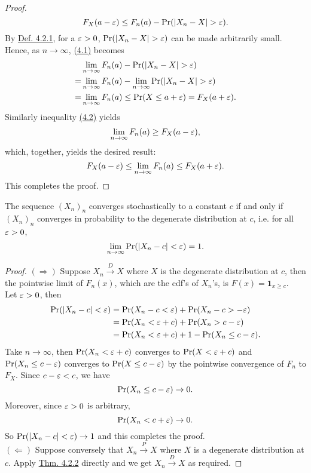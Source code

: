 \documentclass[11pt,fleqn]{book} %
\begin{document}
\begin{proof}
\begin{equation}
F_X(a - \varepsilon) \leq F_n(a) - \Pr(|X_n - X| > \varepsilon).
\end{equation}
\indent By \hyperref[def:421]{Def. 4.2.1}, for a \(\varepsilon > 0\), \(\Pr(|X_n - X| > \varepsilon)\) can be made arbitrarily small. Hence, as \(n\rightarrow\infty\), \hyperref[eqn:4221]{(4.1)} becomes 
\[
\begin{aligned}
&\lim_{n\rightarrow\infty} F_n(a) - \Pr(|X_n - X| > \varepsilon) \\
= &\lim_{n\rightarrow\infty} F_n(a) - \lim_{n\rightarrow\infty}\Pr(|X_n - X| > \varepsilon) \\
= &\lim_{n\rightarrow\infty} F_n(a) 
\leq \Pr(X \leq a + \varepsilon) 
= F_X(a + \varepsilon).
\end{aligned}
\]
\indent Similarly inequality \hyperref[eqn:4222]{(4.2)} yields
\[
\lim_{n\rightarrow\infty} F_n(a) \geq F_X(a - \varepsilon),
\]
which, together, yields the desired result:
\[
F_X(a - \varepsilon) \leq \lim_{n\rightarrow\infty}F_n(a) \leq F_X(a + \varepsilon).
\]
\indent This completes the proof.
\end{proof}

\begin{theorem} \label{thm:423}
The sequence \((X_n)_n\) converges stochastically to a constant \(c\) if and only if \((X_n)_n\) converges in probability to the degenerate distribution at \(c\), i.e. for all \(\varepsilon > 0\),
\[
\lim_{n\rightarrow\infty}\Pr(|X_n - c| < \varepsilon) = 1.
\]
\end{theorem}
\begin{proof} \((\Rightarrow)\) Suppose \(X_n \xrightarrow{D}X\) where \(X\) is the degenerate distribution at \(c\), then the pointwise limit of \(F_n(x)\), which are the cdf's of \(X_n\)'s, is \(F(x) = \mathbf{1}_{x \geq c}\). \\
\indent Let \(\varepsilon > 0\), then
\[
\begin{aligned}
\Pr(|X_n - c| < \varepsilon) &= \Pr(X_n - c < \varepsilon) + \Pr(X_n - c > -\varepsilon) \\
&= \Pr(X_n < \varepsilon + c) + \Pr(X_n > c - \varepsilon) \\
&= \Pr(X_n < \varepsilon + c) + 1 - \Pr(X_n \leq c - \varepsilon).
\end{aligned}
\]
\indent Take \(n\rightarrow\infty\), then \(\Pr(X_n < \varepsilon + c)\) converges to \(\Pr(X < \varepsilon + c)\) and \(\Pr(X_n \leq c - \varepsilon)\) converges to \(\Pr(X \leq c - \varepsilon)\) by the pointwise convergence of \(F_n\) to \(F_X\). Since \(c - \varepsilon < c\), we have
\[
\Pr(X_n \leq c - \varepsilon) \rightarrow 0.
\]
\indent Moreover, since \(\varepsilon > 0\) is arbitrary,
\[
\Pr(X_n < c + \varepsilon) \rightarrow 0.
\]
\indent So \(\Pr(|X_n - c| < \varepsilon) \rightarrow 1\) and this completes the proof. \\
\((\Leftarrow)\) Suppose conversely that \(X_n\xrightarrow{P}X\) where \(X\) is a degenerate distribution at \(c\). Apply \hyperref[thm:422]{Thm. 4.2.2} directly and we get \(X_n \xrightarrow{D} X\) as required.
\end{proof}
\end{document}
